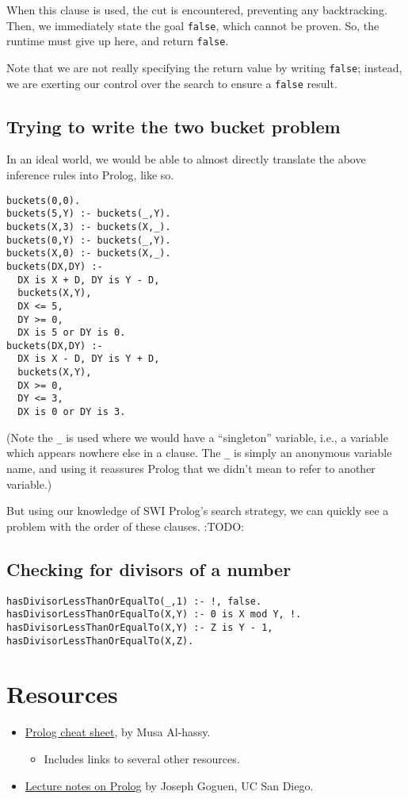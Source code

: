 \documentclass[11pt]{article}
\begin{document}
When this clause is used, the cut is encountered,
preventing any backtracking.
Then, we immediately state the goal \texttt{false},
which cannot be proven.
So, the runtime must give up here, and return \texttt{false}.

Note that we are not really specifying the return value
by writing \texttt{false}; instead, we are exerting our control
over the search to ensure a \texttt{false} result.

\subsection{Trying to write the two bucket problem}
\label{sec:org31d4f83}
In an ideal world, we would be able to almost directly translate
the above inference rules into Prolog, like so.
\begin{verbatim}
buckets(0,0).
buckets(5,Y) :- buckets(_,Y).
buckets(X,3) :- buckets(X,_).
buckets(0,Y) :- buckets(_,Y).
buckets(X,0) :- buckets(X,_).
buckets(DX,DY) :-
  DX is X + D, DY is Y - D,
  buckets(X,Y),
  DX <= 5,
  DY >= 0,
  DX is 5 or DY is 0.
buckets(DX,DY) :-
  DX is X - D, DY is Y + D,
  buckets(X,Y),
  DX >= 0,
  DY <= 3,
  DX is 0 or DY is 3.
\end{verbatim}
(Note the \texttt{\_} is used where we would have a “singleton” variable,
i.e., a variable which appears nowhere else in a clause.
The \texttt{\_} is simply an anonymous variable name, and using it
reassures Prolog that we didn't mean to refer to another variable.)

But using our knowledge of SWI Prolog's search strategy,
we can quickly see a problem with the order of these clauses.
:TODO:

\subsection{Checking for divisors of a number}
\label{sec:orgaf79093}
\begin{verbatim}
hasDivisorLessThanOrEqualTo(_,1) :- !, false.
hasDivisorLessThanOrEqualTo(X,Y) :- 0 is X mod Y, !.
hasDivisorLessThanOrEqualTo(X,Y) :- Z is Y - 1, hasDivisorLessThanOrEqualTo(X,Z).
\end{verbatim}

\section{Resources}
\label{sec:org1afa97c}
\begin{itemize}
\item \href{https://github.com/alhassy/PrologCheatSheet}{Prolog cheat sheet},
by Musa Al-hassy.
\begin{itemize}
\item Includes links to several other resources.
\end{itemize}
\item \href{https://cseweb.ucsd.edu/\~goguen/courses/130w04/prolog.html}{Lecture notes on Prolog}
by Joseph Goguen, UC San Diego.
\end{itemize}
\end{document}
